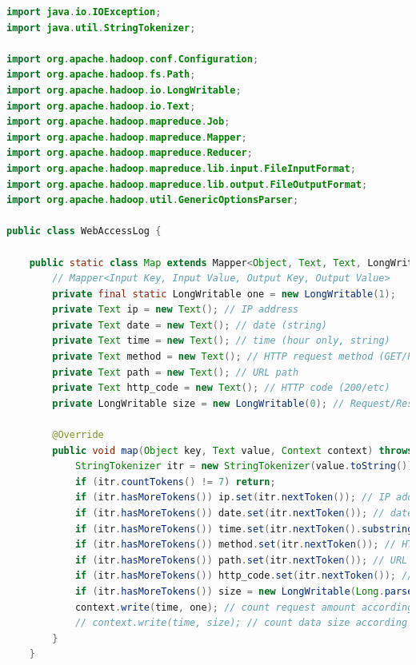 \documentclass{article}
\begin{document}
\begin{lstlisting}[language=java]
import java.io.IOException;
import java.util.StringTokenizer;

import org.apache.hadoop.conf.Configuration;
import org.apache.hadoop.fs.Path;
import org.apache.hadoop.io.LongWritable;
import org.apache.hadoop.io.Text;
import org.apache.hadoop.mapreduce.Job;
import org.apache.hadoop.mapreduce.Mapper;
import org.apache.hadoop.mapreduce.Reducer;
import org.apache.hadoop.mapreduce.lib.input.FileInputFormat;
import org.apache.hadoop.mapreduce.lib.output.FileOutputFormat;
import org.apache.hadoop.util.GenericOptionsParser;

public class WebAccessLog {

    public static class Map extends Mapper<Object, Text, Text, LongWritable> {
        // Mapper<Input Key, Input Value, Output Key, Output Value>
        private final static LongWritable one = new LongWritable(1);
        private Text ip = new Text(); // IP address
        private Text date = new Text(); // date (string)
        private Text time = new Text(); // time (hour only, string)
        private Text method = new Text(); // HTTP request method (GET/POST/etc)
        private Text path = new Text(); // URL path
        private Text http_code = new Text(); // HTTP code (200/etc)
        private LongWritable size = new LongWritable(0); // Request/Response size (in Bytes)

        @Override
        public void map(Object key, Text value, Context context) throws IOException, InterruptedException {
            StringTokenizer itr = new StringTokenizer(value.toString());
            if (itr.countTokens() != 7) return;
            if (itr.hasMoreTokens()) ip.set(itr.nextToken()); // IP address
            if (itr.hasMoreTokens()) date.set(itr.nextToken()); // date (string)
            if (itr.hasMoreTokens()) time.set(itr.nextToken().substring(0, 2)); // time (hour only, string)
            if (itr.hasMoreTokens()) method.set(itr.nextToken()); // HTTP request method (GET/POST/etc)
            if (itr.hasMoreTokens()) path.set(itr.nextToken()); // URL path
            if (itr.hasMoreTokens()) http_code.set(itr.nextToken()); // HTTP code (200/etc)
            if (itr.hasMoreTokens()) size = new LongWritable(Long.parseLong(itr.nextToken())); // Request/Response size (in Bytes)
            context.write(time, one); // count request amount according to time
            // context.write(time, size); // count data size according to time
        }
    }


\end{lstlisting}
\end{document}
